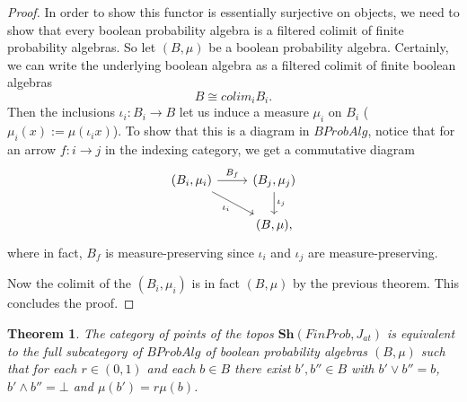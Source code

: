 \documentclass[a4paper,draft]{amsproc}
\theoremstyle{plain}
\newtheorem{theorem}{Theorem}[section]
\theoremstyle{definition}
\theoremstyle{remark}
\numberwithin{equation}{section}
\begin{document}
\begin{proof}
In order to show this functor is essentially surjective on objects, we need to show that every boolean probability algebra is a filtered colimit of finite probability algebras. So let $(B, \mu)$ be a boolean probability algebra. Certainly, we can write the underlying boolean algebra as a filtered colimit of finite boolean algebras
\[
B \cong colim_i B_i.
\]
Then the inclusions $\iota_i: B_i \to B$ let us induce a measure $\mu_i$ on $B_i$ ($\mu_i(x) := \mu(\iota_i x)$). To show that this is a diagram in $BProbAlg$, notice that for an arrow $f: i \to j$ in the indexing category, we get a commutative diagram
\[
\begin{tikzcd}
{(B_i,\mu_i)} \arrow[r, "B_f"] \arrow[rd, "\iota_i"'] & {(B_j,\mu_j)} \arrow[d, "\iota_j"] \\
                                                      & {(B,\mu)}                         ,
\end{tikzcd}
\]
where in fact, $B_f$ is measure-preserving since $\iota_i$ and $\iota_j$ are measure-preserving.

Now the colimit of the $(B_i, \mu_i)$ is in fact $(B, \mu)$ by the previous theorem. This concludes the proof.
\end{proof}
\begin{theorem} The category of points of the topos $\textbf{Sh}(FinProb,J_{at})$ is equivalent to the full subcategory of $BProbAlg$ of boolean probability algebras $(B,\mu)$ such that for each $r\in (0,1)$ and each $b\in B$ there exist $b', b''\in B$ with $b'\vee b''=b$, $b'\wedge b''=\bot$ and $\mu(b')=r\mu(b)$.\end{theorem}
\end{document}
